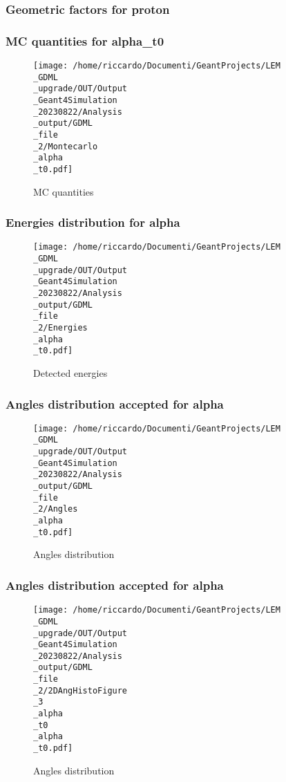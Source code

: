 \documentclass[8pt]{beamer}
\begin{document}
            \begin{frame}
                \frametitle{Geometric factors for proton}
            
            \end{frame}
            
            \begin{frame}
                \frametitle{MC quantities for alpha\_t0}
            
        \begin{figure}[h]
            \centering
            \texttt{[image: /home/riccardo/Documenti/GeantProjects/LEM\\\_GDML\\\_upgrade/OUT/Output\\\_Geant4Simulation\\\_20230822/Analysis\\\_output/GDML\\\_file\\\_2/Montecarlo\\\_alpha\\\_t0.pdf]}
            \caption{MC quantities}
        \end{figure}
        
            \end{frame}
            
            \begin{frame}
                \frametitle{Energies distribution for alpha}
            
        \begin{figure}[h]
            \centering
            \texttt{[image: /home/riccardo/Documenti/GeantProjects/LEM\\\_GDML\\\_upgrade/OUT/Output\\\_Geant4Simulation\\\_20230822/Analysis\\\_output/GDML\\\_file\\\_2/Energies\\\_alpha\\\_t0.pdf]}
            \caption{Detected energies}
        \end{figure}
        
            \end{frame}
            
            \begin{frame}
                \frametitle{Angles distribution accepted for alpha}
            
        \begin{figure}[h]
            \centering
            \texttt{[image: /home/riccardo/Documenti/GeantProjects/LEM\\\_GDML\\\_upgrade/OUT/Output\\\_Geant4Simulation\\\_20230822/Analysis\\\_output/GDML\\\_file\\\_2/Angles\\\_alpha\\\_t0.pdf]}
            \caption{Angles distribution}
        \end{figure}
        
            \end{frame}
            
            \begin{frame}
                \frametitle{Angles distribution accepted for alpha}
            
        \begin{figure}[h]
            \centering
            \texttt{[image: /home/riccardo/Documenti/GeantProjects/LEM\\\_GDML\\\_upgrade/OUT/Output\\\_Geant4Simulation\\\_20230822/Analysis\\\_output/GDML\\\_file\\\_2/2DAngHistoFigure\\\_3\\\_alpha\\\_t0\\\_alpha\\\_t0.pdf]}
            \caption{Angles distribution}
        \end{figure}
        
            \end{frame}
            
\end{document}
